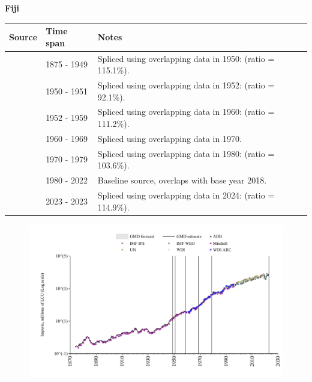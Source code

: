 \documentclass[12pt,a4paper,landscape]{article}
\begin{document}
\begin{adjustbox}{max totalsize={\paperwidth}{\paperheight},center}
\begin{minipage}[t][\textheight][t]{\textwidth}
\vspace*{0.5cm}
{}
\begin{center}
{\Large\bfseries Fiji}
\end{center}
\vspace{0.5cm}
\begin{table}[H]
\centering
\small
\begin{tabular}{|l|l|l|}
\hline
\textbf{Source} & \textbf{Time span} & \textbf{Notes} \\
\hline
\rowcolor{white}\cite{Mitchell}& 1875 - 1949 &Spliced using overlapping data in 1950: (ratio = 115.1\%).\\
\rowcolor{lightgray}\cite{IMF_IFS}& 1950 - 1951 &Spliced using overlapping data in 1952: (ratio = 92.1\%).\\
\rowcolor{white}\cite{Mitchell}& 1952 - 1959 &Spliced using overlapping data in 1960: (ratio = 111.2\%).\\
\rowcolor{lightgray}\cite{WDI_ARC}& 1960 - 1969 &Spliced using overlapping data in 1970.\\
\rowcolor{white}\cite{UN}& 1970 - 1979 &Spliced using overlapping data in 1980: (ratio = 103.6\%).\\
\rowcolor{lightgray}\cite{WDI}& 1980 - 2022 &Baseline source, overlaps with base year 2018.\\
\rowcolor{white}\cite{ADB}& 2023 - 2023 &Spliced using overlapping data in 2024: (ratio = 114.9\%).\\
\hline
\end{tabular}
\end{table}
\begin{figure}[H]
\centering
\includegraphics[width=\textwidth,height=0.6\textheight,keepaspectratio]{graphs/FJI_imports.pdf}
\end{figure}
\end{minipage}
\end{adjustbox}
\end{document}
